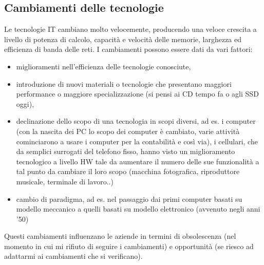 \subsection{Cambiamenti delle tecnologie}
Le tecnologie IT cambiano molto velocemente, producendo una veloce crescita a livello di potenza di calcolo, capacit\`a e velocit\`a delle memorie, larghezza ed efficienza di banda delle reti.
I cambiamenti possono essere dati da vari fattori:
\begin{itemize}
\item miglioramenti nell'efficienza delle tecnologie conosciute, 
\item introduzione di nuovi materiali o tecnologie che presentano maggiori performance o maggiore specializzazione (si pensi ai CD tempo fa o agli SSD oggi), 
\item declinazione dello scopo di una tecnologia in scopi diversi, ad es. i computer (con la nascita dei PC lo scopo dei computer \`e cambiato, varie attivit\`a cominciarono a usare i computer per la contabilit\`a e cos\`i via), i cellulari, che da semplici surrogati del telefono fisso, hanno visto un miglioramento tecnologico a livello HW tale da aumentare il numero delle sue funzionalit\`a a tal punto da cambiare il loro scopo (macchina fotografica, riproduttore musicale, terminale di lavoro..)
\item cambio di paradigma, ad es. nel passaggio dai primi computer basati su modello meccanico a quelli basati su modello elettronico (avvenuto negli anni '50)
\end{itemize}

Questi cambiamenti influenzano le aziende in termini di obsolescenza (nel momento in cui mi rifiuto di seguire i cambiamenti) e opportunit\`a (se riesco ad adattarmi ai cambiamenti che si verificano).

